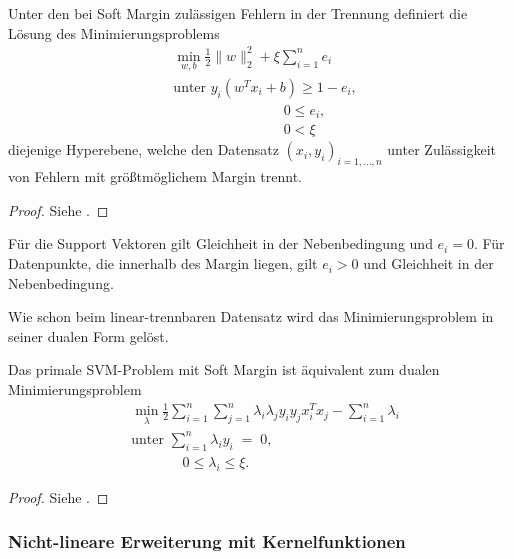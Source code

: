 \begin{satz}
	Unter den bei Soft Margin zulässigen Fehlern in der Trennung definiert die Lösung des Minimierungsproblems
	\begin{align*}
		 &\min_{w,b} \frac{1}{2}\|w\|^2_2 + \xi\sum_{i=1}^{n}e_i\\
		 &\text{unter } y_i\left(w^Tx_i+b\right)\geq 1-e_i,\\
		 &\qquad\qquad\qquad\quad\:\:\:\:  0\leq e_i,\\
		 &\qquad\qquad\qquad\quad\:\:\:\:  0< \xi
	\end{align*}
	diejenige Hyperebene, welche den Datensatz \((x_i,y_i)_{i=1,\dots,n}\) unter Zulässigkeit von Fehlern mit größtmöglichem Margin trennt.
\end{satz}

\begin{proof}
	Siehe \cite{SVM}.
\end{proof}

\begin{bem}
	Für die Support Vektoren gilt Gleichheit in der Nebenbedingung und \(e_i=0\). Für Datenpunkte, die innerhalb des Margin liegen, gilt \(e_i>0\) und Gleichheit in der Nebenbedingung.
\end{bem}

Wie schon beim linear-trennbaren Datensatz wird das Minimierungsproblem in seiner dualen Form gelöst.

\begin{satz}
	Das primale SVM-Problem mit Soft Margin ist äquivalent zum dualen Minimierungsproblem
	\begin{align*}
		&\min_{\lambda} \frac{1}{2}\sum_{i=1}^{n}\sum_{j=1}^{n}\lambda_i\lambda_jy_iy_jx_i^Tx_j-\sum_{i=1}^{n}\lambda_i\\
		&\text{unter } \sum_{i=1}^{n}\lambda_iy_i\;=\;0,\\
		&\qquad\quad\:\:\: 0\leq\lambda_i\leq\xi.
	\end{align*}
\end{satz}

\begin{proof}
	Siehe \cite{SVM}.
\end{proof}

\subsubsection{Nicht-lineare Erweiterung mit Kernelfunktionen}

